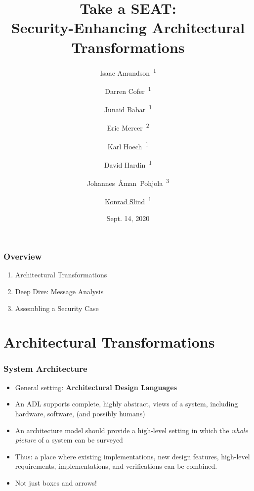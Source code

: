 \documentclass{beamer}
\begin{document}

\author{Isaac Amundson~\textsuperscript{1} \and %
Darren Cofer~\textsuperscript{1} \and %
Junaid Babar~\textsuperscript{1} \and %
Eric Mercer~\textsuperscript{2} \and %
Karl Hoech~\textsuperscript{1} \and %
David Hardin~\textsuperscript{1} \and %
Johannes~{\AA}man~Pohjola~\textsuperscript{3} \and %
\underline{Konrad Slind}~\textsuperscript{1}
}


\date{Sept. 14, 2020}
\title{Take a SEAT: \\ Security-Enhancing Architectural Transformations}
\maketitle

\begin{frame}\frametitle{Overview}
\begin{enumerate}
\item Architectural Transformations
\item Deep Dive: Message Analysis
\item Assembling a Security Case
\end{enumerate}
\end{frame}


\section {Architectural Transformations}

\begin{frame}\frametitle{System Architecture}
\begin{itemize}

\item General setting: \textbf{Architectural Design Languages}

\item An ADL supports complete, highly abstract, views of a system,
  including hardware, software, (and possibly humans)

\item An architecture model should provide a high-level setting in which
  the \emph{whole picture} of a system can be surveyed

\item Thus: a place where existing implementations, new design
  features, high-level requirements, implementations, and
  verifications can be combined.

\item Not just boxes and arrows!

\end{itemize}

\end{frame}
\end{document}
